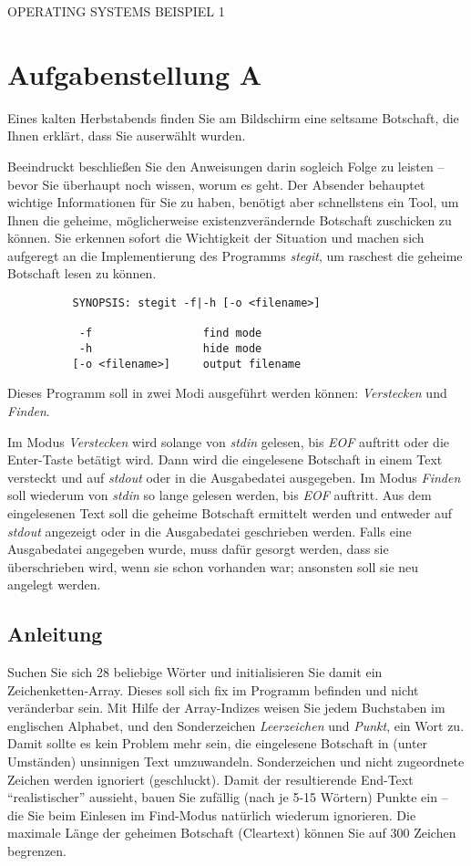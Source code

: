 \documentclass{article}
\begin{document}
\begin{center}
\begin{Large}
OPERATING SYSTEMS BEISPIEL 1
\end{Large}
\end{center}
\section*{Aufgabenstellung A}

Eines kalten Herbstabends finden Sie am Bildschirm eine seltsame Botschaft, die
Ihnen erklärt, dass Sie auserwählt wurden.

Beeindruckt beschließen Sie den Anweisungen darin sogleich Folge zu leisten --
bevor Sie überhaupt noch wissen, worum es geht. Der Absender behauptet wichtige
Informationen für Sie zu haben, benötigt aber schnellstens ein Tool, um Ihnen
die geheime, möglicherweise existenzverändernde Botschaft zuschicken zu können.
Sie erkennen sofort die Wichtigkeit der Situation und machen sich aufgeregt an
die Implementierung des Programms \emph{stegit}, um raschest die geheime
Botschaft lesen zu können.

\begin{verbatim}
          SYNOPSIS: stegit -f|-h [-o <filename>]

           -f                 find mode
           -h                 hide mode
          [-o <filename>]     output filename
\end{verbatim}

Dieses Programm soll in zwei Modi ausgeführt werden können: \emph{Verstecken}
und \emph{Finden}.

Im Modus \emph{Verstecken} wird solange von \emph{stdin} gelesen, bis \emph{EOF}
auftritt oder die Enter-Taste betätigt wird. Dann wird die eingelesene Botschaft
in einem Text versteckt und auf \emph{stdout} oder in die Ausgabedatei
ausgegeben. Im Modus \emph{Finden} soll wiederum von \emph{stdin} so lange
gelesen werden, bis \emph{EOF} auftritt. Aus dem eingelesenen Text soll die
geheime Botschaft ermittelt werden und entweder auf \emph{stdout} angezeigt oder
in die Ausgabedatei geschrieben werden. Falls eine Ausgabedatei angegeben wurde,
muss dafür gesorgt werden, dass sie überschrieben wird, wenn sie schon vorhanden
war; ansonsten soll sie neu angelegt werden.

\subsection*{Anleitung}
Suchen Sie sich 28 beliebige Wörter und initialisieren Sie damit ein
Zeichenketten-Array. Dieses soll sich fix im Programm befinden und nicht
veränderbar sein. Mit Hilfe der Array-Indizes weisen Sie jedem Buchstaben im
englischen Alphabet, und den Sonderzeichen \emph{Leerzeichen} und \emph{Punkt},
ein Wort zu. Damit sollte es kein Problem mehr sein, die eingelesene Botschaft
in (unter Umständen) unsinnigen Text umzuwandeln. Sonderzeichen und nicht
zugeordnete Zeichen werden ignoriert (geschluckt). Damit der resultierende
End-Text "`realistischer"' aussieht, bauen Sie zufällig (nach je 5-15 Wörtern)
Punkte ein -- die Sie beim Einlesen im Find-Modus natürlich wiederum ignorieren.
Die maximale Länge der geheimen Botschaft (Cleartext) können Sie auf 300 Zeichen
begrenzen.
\end{document}
